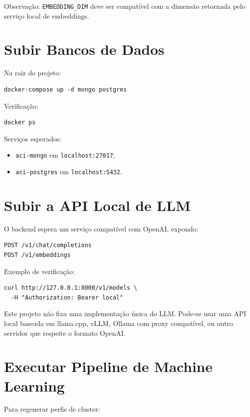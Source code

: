 \documentclass[12pt,a4paper]{article}
\begin{document}
Observação: \texttt{EMBEDDING\_DIM} deve ser compatível com a dimensão retornada pelo serviço local de embeddings.

\section{Subir Bancos de Dados}

Na raiz do projeto:

\begin{verbatim}
docker-compose up -d mongo postgres
\end{verbatim}

Verificação:

\begin{verbatim}
docker ps
\end{verbatim}

Serviços esperados:

\begin{itemize}
  \item \texttt{aci-mongo} em \texttt{localhost:27017};
  \item \texttt{aci-postgres} em \texttt{localhost:5432}.
\end{itemize}

\section{Subir a API Local de LLM}

O backend espera um serviço compatível com OpenAI, expondo:

\begin{verbatim}
POST /v1/chat/completions
POST /v1/embeddings
\end{verbatim}

Exemplo de verificação:

\begin{verbatim}
curl http://127.0.0.1:8000/v1/models \
  -H "Authorization: Bearer local"
\end{verbatim}

Este projeto não fixa uma implementação única do LLM. Pode-se usar uma API local baseada em llama.cpp, vLLM, Ollama com proxy compatível, ou outro servidor que respeite o formato OpenAI.

\section{Executar Pipeline de Machine Learning}

Para regenerar perfis de cluster:
\end{document}
